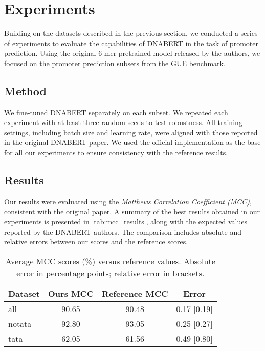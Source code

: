 \section{Experiments}

Building on the datasets described in the previous section, we conducted a series of experiments to evaluate the capabilities of DNABERT in the task of promoter prediction. Using the original 6-mer pretrained model released by the authors, we focused on the promoter prediction subsets from the GUE benchmark.

\subsection{Method}

We fine-tuned DNABERT separately on each subset. We repeated each experiment with at least three random seeds to test robustness. All training settings, including batch size and learning rate, were aligned with those reported in the original DNABERT paper. We used the official implementation as the base for all our experiments to ensure consistency with the reference results.

\subsection{Results}

Our results were evaluated using the \textit{Matthews Correlation Coefficient (MCC)}, consistent with the original paper. A summary of the best results obtained in our experiments is presented in \autoref{tab:mcc_results}, along with the expected values reported by the DNABERT authors. The comparison includes absolute and relative errors between our scores and the reference scores.

\begin{table}[h!]
    \centering
    \small %
    \begin{tabular}{lccc}
        \toprule
        Dataset & Ours MCC & Reference MCC & Error \\
        \midrule
        all    & 90.65 & 90.48 & 0.17 [0.19] \\
        notata & 92.80 & 93.05 & 0.25 [0.27] \\
        tata   & 62.05 & 61.56 & 0.49 [0.80] \\
        \bottomrule
    \end{tabular}
    \caption{Average MCC scores (\%) versus reference values. Absolute error in percentage points; relative error in brackets.}
    \label{tab:mcc_results}
\end{table}

